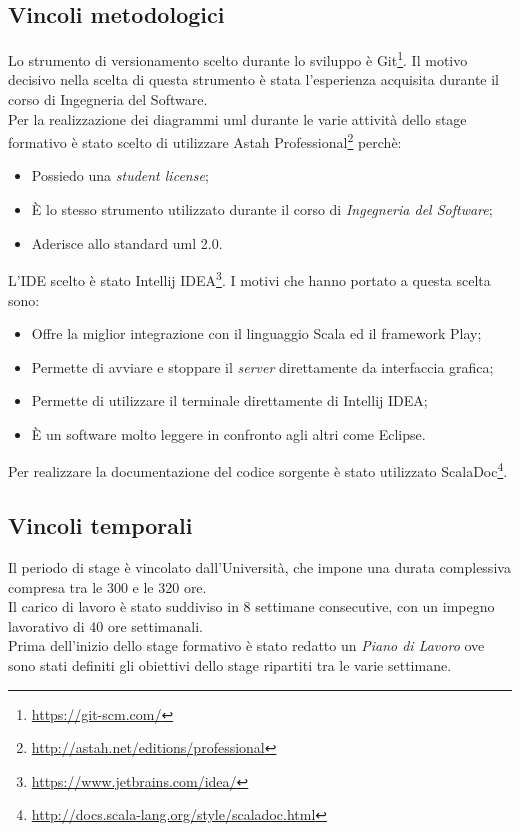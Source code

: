 \subsection{Vincoli metodologici}
Lo strumento di versionamento scelto durante lo sviluppo è Git\footnote{\url{https://git-scm.com/}}. Il motivo decisivo nella scelta di questa strumento è stata l'esperienza acquisita durante il corso di Ingegneria del Software.\\
Per la realizzazione dei diagrammi \gls{uml} durante le varie attività dello stage formativo è stato scelto di utilizzare Astah Professional\footnote{\url{http://astah.net/editions/professional}} perchè:
\begin{itemize}
	\item Possiedo una \textit{student license};
	\item È lo stesso strumento utilizzato durante il corso di \textit{Ingegneria del Software};
	\item Aderisce allo standard \gls{uml} 2.0.	
\end{itemize}
L'\gls{IDE} scelto è stato Intellij IDEA\footnote{\url{https://www.jetbrains.com/idea/}}. I motivi che hanno portato a questa scelta sono:
\begin{itemize}
	\item Offre la miglior integrazione con il linguaggio Scala ed il \gls{framework} Play;
	\item Permette di avviare e stoppare il \textit{server} direttamente da interfaccia grafica;
	\item Permette di utilizzare il terminale direttamente di Intellij IDEA;
	\item È un software molto leggere in confronto agli altri come Eclipse.
\end{itemize}
Per realizzare la documentazione del codice sorgente è stato utilizzato ScalaDoc\footnote{\url{http://docs.scala-lang.org/style/scaladoc.html}}.

\subsection{Vincoli temporali}
Il periodo di stage è vincolato dall'Università, che impone una durata complessiva compresa tra le 300 e le 320 ore.\\
Il carico di lavoro è stato suddiviso in 8 settimane consecutive, con un impegno lavorativo di 40 ore settimanali.\\
Prima dell'inizio dello stage formativo è stato redatto un \textit{Piano di Lavoro }ove sono stati definiti gli obiettivi dello stage ripartiti tra le varie settimane.